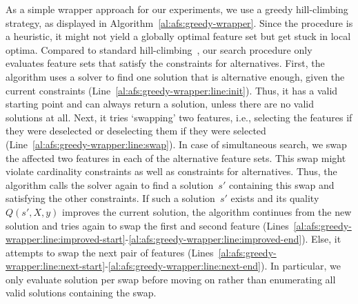 \documentclass{article}
\theoremstyle{definition}
\begin{document}
As a simple wrapper approach for our experiments, we use a greedy hill-climbing strategy, as displayed in Algorithm~\ref{al:afs:greedy-wrapper}.
Since the procedure is a heuristic, it might not yield a globally optimal feature set but get stuck in local optima.
Compared to standard hill-climbing~\cite{kohavi1997wrappers}, our search procedure only evaluates feature sets that satisfy the constraints for alternatives.
First, the algorithm uses a solver to find one solution that is alternative enough, given the current constraints (Line~\ref{al:afs:greedy-wrapper:line:init}).
Thus, it has a valid starting point and can always return a solution, unless there are no valid solutions at all.
Next, it tries `swapping' two features, i.e., selecting the features if they were deselected or deselecting them if they were selected (Line~\ref{al:afs:greedy-wrapper:line:swap}).
In case of simultaneous search, we swap the affected two features in each of the alternative feature sets.
This swap might violate cardinality constraints as well as constraints for alternatives.
Thus, the algorithm calls the solver again to find a solution~$s'$ containing this swap and satisfying the other constraints.
If such a solution~$s'$ exists and its quality~$Q(s',X,y)$ improves the current solution, the algorithm continues from the new solution and tries again to swap the first and second feature (Lines~\ref{al:afs:greedy-wrapper:line:improved-start}-\ref{al:afs:greedy-wrapper:line:improved-end}).
Else, it attempts to swap the next pair of features (Lines~\ref{al:afs:greedy-wrapper:line:next-start}-\ref{al:afs:greedy-wrapper:line:next-end}).
In particular, we only evaluate solution per swap before moving on rather than enumerating all valid solutions containing the swap.
\end{document}
